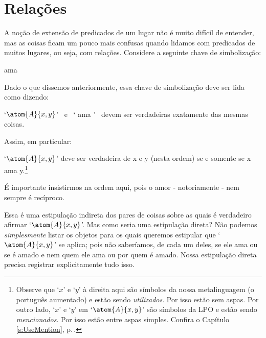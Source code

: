 \section{Relações}
A noção de extensão de predicados de um lugar não é muito difícil de entender, mas as coisas ficam um pouco mais confusas quando lidamos com predicados de muitos lugares, ou seja, com relações.
Considere a seguinte chave de simbolização:
\begin{center}
	\begin{ekey}
		\item[\atom{A}{x,y}]  ama 
	\end{ekey}
\end{center}
Dado o que dissemos anteriormente, essa chave de simbolização deve ser lida como dizendo:
	\begin{earg}
		\item[\textbullet] `$\atom{A}{x,y}$'  \ e \ ` ama ' \ devem ser verdadeiras exatamente das mesmas coisas.
	\end{earg}
Assim, em particular:
	\begin{earg}
		\item[\textbullet] `$\atom{A}{x,y}$' deve ser verdadeira de x e y (nesta ordem) se e somente se x ama y.\footnote{
			Observe que `$x$' e `$y$' à direita aqui são símbolos da nossa metalinguagem (o português aumentado) e estão sendo \emph{utilizados}.
			Por isso estão sem aspas.
			Por outro lado, `$x$' e `$y$' em `$\atom{A}{x, y}$' são símbolos da LPO e estão sendo \emph{mencionados}.
			Por isso estão entre aspas simples.
			Confira o Capítulo \ref{s:UseMention}, p.\,\pageref{s:UseMention}.} 
	\end{earg}
É importante insistirmos na ordem aqui, pois o amor - notoriamente - nem sempre é recíproco.

Essa é uma estipulação indireta dos pares de coisas  sobre as quais é verdadeiro afirmar `$\atom{A}{x,y}$'.
Mas como seria uma estipulação direta?
Não podemos \emph{simplesmente} listar os objetos para os quais queremos estipular que `$\atom{A}{x,y}$' se aplica; pois não saberíamos, de cada um deles, se ele ama ou se é amado e nem quem ele ama ou por quem é amado.
Nossa estipulação direta precisa registrar explicitamente tudo isso.

